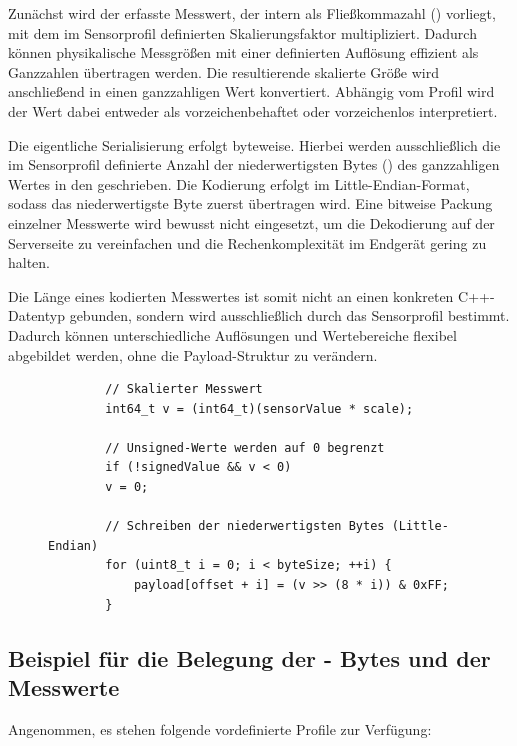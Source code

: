 Zunächst wird der erfasste Messwert, der intern als Flie{\ss}kommazahl () vorliegt, mit dem im Sensorprofil definierten Skalierungsfaktor multipliziert. Dadurch können physikalische Messgrö{\ss}en mit einer definierten Auflösung effizient als Ganzzahlen übertragen werden. Die resultierende skalierte Grö{\ss}e wird anschlie{\ss}end in einen ganzzahligen Wert konvertiert. Abhängig vom Profil wird der Wert dabei entweder als vorzeichenbehaftet oder vorzeichenlos interpretiert.

Die eigentliche Serialisierung erfolgt byteweise. Hierbei werden ausschlie{\ss}lich die im Sensorprofil definierte Anzahl der niederwertigsten Bytes () des ganzzahligen Wertes in den  geschrieben. Die Kodierung erfolgt im Little-Endian-Format, sodass das niederwertigste Byte zuerst übertragen wird. Eine bitweise Packung einzelner Messwerte wird bewusst nicht eingesetzt, um die Dekodierung auf der Serverseite zu vereinfachen und die Rechenkomplexität im Endgerät gering zu halten.

Die Länge eines kodierten Messwertes ist somit nicht an einen konkreten C++-Datentyp gebunden, sondern wird ausschlie{\ss}lich durch das Sensorprofil bestimmt. Dadurch können unterschiedliche Auflösungen und Wertebereiche flexibel abgebildet werden, ohne die Payload-Struktur zu verändern.

\begin{figure}[H]
	\begin{verbatim}
		// Skalierter Messwert
		int64_t v = (int64_t)(sensorValue * scale);
		
		// Unsigned-Werte werden auf 0 begrenzt
		if (!signedValue && v < 0)
		v = 0;
		
		// Schreiben der niederwertigsten Bytes (Little-Endian)
		for (uint8_t i = 0; i < byteSize; ++i) {
			payload[offset + i] = (v >> (8 * i)) & 0xFF;
		}
	\end{verbatim}
\end{figure}



\subsection{Beispiel für die Belegung der - Bytes und der Messwerte}
	Angenommen, es stehen folgende vordefinierte Profile zur Verfügung:

